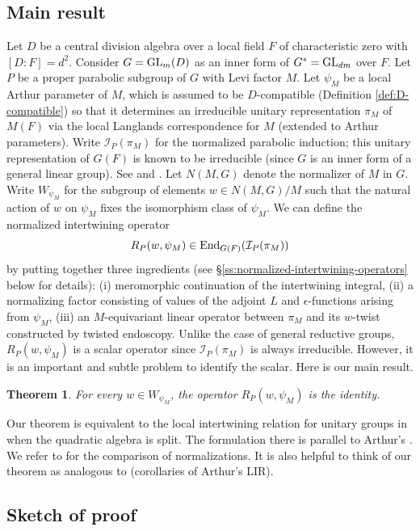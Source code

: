 \documentclass[11pt,reqno]{amsart}
\theoremstyle{plain}
\newtheorem{thm}{Theorem}[section]
\theoremstyle{definition}
\newcommand{\cI}{\mathcal{I}}
\newcommand{\End}{\tu{End}}
\newcommand{\GL}{\tu{GL}}
\newcommand{\tu}{\textup}
\numberwithin{equation}{subsection}
\begin{document}
\subsection{Main result} 
Let $D$ be a central division algebra over a local field $F$ of characteristic zero with $[D:F]=d^2$. Consider $G=\GL_m(D)$ as an inner form of $G^*=\GL_{dm}$ over $F$. Let $P$ be a proper parabolic subgroup of $G$ with Levi factor $M$. Let $\psi_M$ be a local Arthur parameter of $M$, which is assumed to be $D$-compatible (Definition \ref{def:D-compatible}) so that it determines an irreducible unitary representation $\pi_M$ of $M(F)$ via the local Langlands correspondence for $M$ (extended to Arthur parameters). Write $\cI_P(\pi_M)$ for the normalized parabolic induction; this unitary representation of $G(F)$ is known to be irreducible (since $G$ is an inner form of a general linear group). See \cite{Ber84,Sec09} and \cite{VoganUnitaryDual}. Let $N(M,G)$ denote the normalizer of $M$ in $G$. Write $W_{\psi_M}$ for the subgroup of elements $w\in N(M,G)/M$ such that the natural action of $w$ on $\psi_M$ fixes the isomorphism class of $\psi_M$. We can define the normalized intertwining operator
\[
R_P(w,\psi_M)\in \End_{G(F)}(\cI_P(\pi_M))
\]
by putting together three ingredients (see \S\ref{ss:normalized-intertwining-operators} below for details): (i) meromorphic continuation of the intertwining integral, (ii) a normalizing factor consisting of values of the adjoint $L$ and $\epsilon$-functions arising from $\psi_M$, (iii) an $M$-equivariant linear operator between $\pi_M$ and its $w$-twist constructed by twisted endoscopy. 
Unlike the case of general reductive groups, $R_P(w,\psi_M)$ is a scalar operator since $\cI_P(\pi_M)$ is always irreducible. However, it is an important and subtle problem to identify the scalar. 
Here is our main result.

\begin{thm}
For every $w\in W_{\psi_M}$, the operator $R_P(w,\psi_M)$ is the identity.
\end{thm}

Our theorem is equivalent to the local intertwining relation for
unitary groups in \cite[\S2.6]{KMSW} when the quadratic algebra is
split. The formulation there is parallel to Arthur's
\cite[Thm.~2.4.1]{Arthur}. We refer to \cite[\S\S2.6--2.7]{KMSW}
for the comparison of normalizations. It is also
helpful to think of our theorem as analogous to \cite[Cor.~6.4.5, 7.3.5]{Arthur}
(corollaries of Arthur's LIR).

\subsection{Sketch of proof} 
\end{document}
